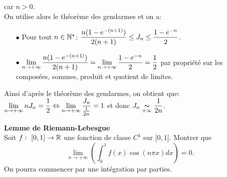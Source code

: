 \documentclass[a4paper, 11pt,reqno]{article}
\begin{document}
\begin{correction}
\begin{enumerate}
		      car $n>0$.\\
		      \noindent On utilise alors le th\'eor\`{e}me des gendarmes et on a:
		      \begin{itemize}
			      \item[$\bullet$] Pour tout $n\in\mathbb{N}^{\star}$: $\displaystyle\frac{n(1-e^{-(n+1)})}{2(n+1)}\leq J_n \leq  \displaystyle\frac{1-e^{-n}}{2}$.
			      \item[$\bullet$] $\lim\limits_{n\to +\infty} \displaystyle\frac{n(1-e^{-(n+1)})}{2(n+1)}=\lim\limits_{n\to +\infty} \displaystyle\frac{1-e^{-n}}{2}=\displaystyle\frac{1}{2}$ par propri\'et\'e sur les compos\'ees, sommes, produit et quotient de limites.
		      \end{itemize}
		      Ainsi d'apr\`{e}s le th\'eor\`{e}me des gendarmes, on obtient que: $\lim\limits_{n\to +\infty} nJ_n=\displaystyle\frac{1}{2}\Leftrightarrow \lim\limits_{n\to +\infty} \displaystyle\frac{J_n}{\frac{1}{2n}}=1$ et donc $J_n\underset{+\infty}{ \thicksim} \displaystyle\frac{1}{2n}$.
	\end{enumerate}
\end{correction}
\begin{exercice}   \; \textbf{Lemme de Riemann-Lebesgue}\\
	\noindent Soit $f:\ \lbrack 0,1\rbrack\rightarrow \mathbb{R}$ une fonction de classe $C^1$ sur $\lbrack 0,1\rbrack$. Montrer que
	$$\lim\limits_{n\to +\infty} \left( \int_0^1 f(x)\cos{(n\pi x)}dx \right)=0.$$
	On pourra commencer par une int\'egration par parties.
\end{exercice}
\end{document}
